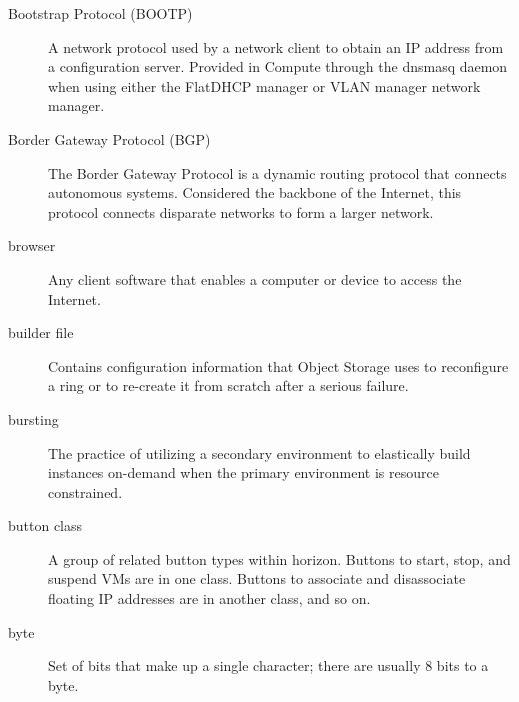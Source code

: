 \documentclass[letterpaper,10pt,english]{sphinxmanual}
\begin{document}
\begin{description}
\item[{Bootstrap Protocol (BOOTP)}] \leavevmode{}\label{_source/glossary:term-bootstrap-protocol-bootp}
A network protocol used by a network client to obtain an IP
address from a configuration server. Provided in Compute through the
dnsmasq daemon when using either the FlatDHCP manager or VLAN manager
network manager.

\item[{Border Gateway Protocol (BGP)}] \leavevmode{}\label{_source/glossary:term-border-gateway-protocol-bgp}
The Border Gateway Protocol is a dynamic routing protocol
that connects autonomous systems.  Considered the
backbone of the Internet, this protocol connects disparate
networks to form a larger network.

\item[{browser}] \leavevmode{}\label{_source/glossary:term-browser}
Any client software that enables a computer or device to access
the Internet.

\item[{builder file}] \leavevmode{}\label{_source/glossary:term-builder-file}
Contains configuration information that Object Storage uses to
reconfigure a ring or to re-create it from scratch after a serious
failure.

\item[{bursting}] \leavevmode{}\label{_source/glossary:term-bursting}
The practice of utilizing a secondary environment to
elastically build instances on-demand when the primary
environment is resource constrained.

\item[{button class}] \leavevmode{}\label{_source/glossary:term-button-class}
A group of related button types within horizon. Buttons to
start, stop, and suspend VMs are in one class. Buttons to associate
and disassociate floating IP addresses are in another class, and so
on.

\item[{byte}] \leavevmode{}\label{_source/glossary:term-byte}
Set of bits that make up a single character; there are usually 8
bits to a byte.

\end{description}
\end{document}
